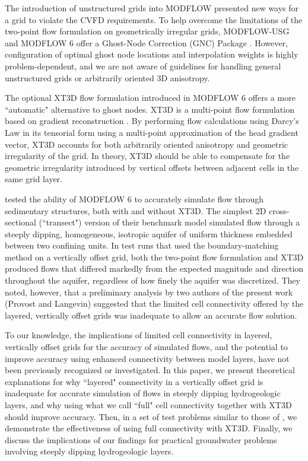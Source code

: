 \documentclass{article}
\begin{document}
The introduction of unstructured grids into MODFLOW \citep{modflowusg, modflow6gwf} presented new ways for a grid to violate the CVFD requirements. To help overcome the limitations of the two-point flow formulation on geometrically irregular grids, MODFLOW-USG and MODFLOW 6 offer a Ghost-Node Correction (GNC) Package \citep{modflowusg, modflow6gwf}. However, configuration of optimal ghost node locations and interpolation weights is highly problem-dependent, and we are not aware of guidelines for handling general unstructured grids or arbitrarily oriented 3D anisotropy.

The optional XT3D flow formulation \citep{modflow6xt3d} introduced in MODFLOW 6 offers a more ``automatic" alternative to ghost nodes. XT3D is a multi-point flow formulation \citep{edwards1998, aavatsmark2002} based on gradient reconstruction \citep{mavriplis2003leastsq, diskin2008accuracy}. By performing flow calculations using Darcy's Law in its tensorial form using a multi-point approximation of the head gradient vector, XT3D accounts for both arbitrarily oriented anisotropy and geometric irregularity of the grid. In theory, XT3D should be able to compensate for the geometric irregularity introduced by vertical offsets between adjacent cells in the same grid layer.

\cite{bardot2023} tested the ability of MODFLOW 6 to accurately simulate flow through sedimentary structures, both with and without XT3D. The simplest 2D cross-sectional (``transect") version of their benchmark model simulated flow through a steeply dipping, homogeneous, isotropic aquifer of uniform thickness embedded between two confining units. In test runs that used the boundary-matching method on a vertically offset grid, both the two-point flow formulation and XT3D produced flows that differed markedly from the expected magnitude and direction throughout the aquifer, regardless of how finely the aquifer was discretized. They noted, however, that a preliminary analysis by two authors of the present work (Provost and Langevin) suggested that the limited cell connectivity offered by the layered, vertically offset grids was inadequate to allow an accurate flow solution.

To our knowledge, the implications of limited cell connectivity in layered, vertically offset grids for the accuracy of simulated flows, and the potential to improve accuracy using enhanced connectivity between model layers, have not been previously recognized or investigated. In this paper, we present theoretical explanations for why ``layered" connectivity in a vertically offset grid is inadequate for accurate simulation of flows in steeply dipping hydrogeologic layers, and why using what we call ``full" cell connectivity together with XT3D should improve accuracy. Then, in a set of test problems similar to those of \cite{bardot2023}, we demonstrate the effectiveness of using full connectivity with XT3D. Finally, we discuss the implications of our findings for practical groundwater problems involving steeply dipping hydrogeologic layers.
\end{document}
